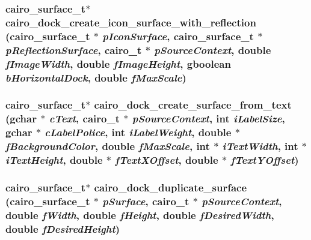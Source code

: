 \subsubsection{\setlength{\rightskip}{0pt plus 5cm}cairo\_\-surface\_\-t$\ast$ cairo\_\-dock\_\-create\_\-icon\_\-surface\_\-with\_\-reflection (cairo\_\-surface\_\-t $\ast$ {\em pIconSurface}, cairo\_\-surface\_\-t $\ast$ {\em pReflectionSurface}, cairo\_\-t $\ast$ {\em pSourceContext}, double {\em fImageWidth}, double {\em fImageHeight}, gboolean {\em bHorizontalDock}, double {\em fMaxScale})}\label{cairo-dock-surface-factory_8h_0609de809472a71aae558f653c3afd22}


\subsubsection{\setlength{\rightskip}{0pt plus 5cm}cairo\_\-surface\_\-t$\ast$ cairo\_\-dock\_\-create\_\-surface\_\-from\_\-text (gchar $\ast$ {\em cText}, cairo\_\-t $\ast$ {\em pSourceContext}, int {\em iLabelSize}, gchar $\ast$ {\em cLabelPolice}, int {\em iLabelWeight}, double $\ast$ {\em fBackgroundColor}, double {\em fMaxScale}, int $\ast$ {\em iTextWidth}, int $\ast$ {\em iTextHeight}, double $\ast$ {\em fTextXOffset}, double $\ast$ {\em fTextYOffset})}\label{cairo-dock-surface-factory_8h_e93904934a3b8e204e1dbc0adbd0e792}


\subsubsection{\setlength{\rightskip}{0pt plus 5cm}cairo\_\-surface\_\-t$\ast$ cairo\_\-dock\_\-duplicate\_\-surface (cairo\_\-surface\_\-t $\ast$ {\em pSurface}, cairo\_\-t $\ast$ {\em pSourceContext}, double {\em fWidth}, double {\em fHeight}, double {\em fDesiredWidth}, double {\em fDesiredHeight})}\label{cairo-dock-surface-factory_8h_157233143037e32dc1b3866b31387380}



